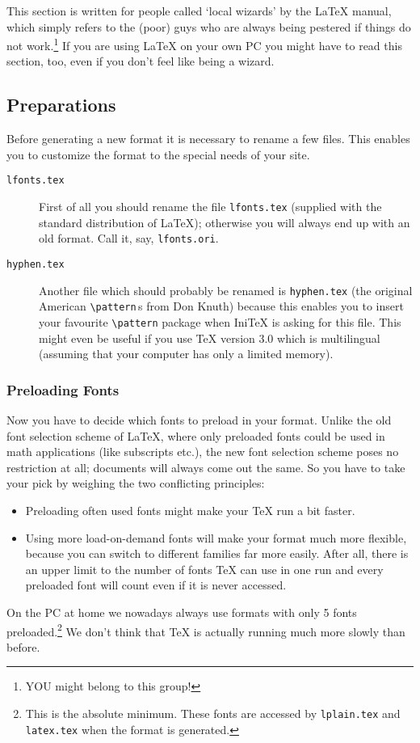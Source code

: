  This section is written for people called `local wizards' by the
 \LaTeX{} manual, which simply refers to the (poor) guys who
 are always being pestered
 if things do not work.\footnote{YOU might belong to this group!}
 If you are using \LaTeX{} on your own PC you might have to read this
 section, too, even if you don't feel like being a wizard.
 
 \subsection{Preparations}
 Before generating a new format it is necessary to rename a few files.
 This enables you to customize the format to the special needs of your
 site.
 
\begin{description}
  \item [\tt lfonts.tex]
    First of all you should rename the file {\tt lfonts.tex} (supplied
    with the standard distribution of \LaTeX{}); otherwise you
    will always end up with an old format.  Call it, say,
    {\tt lfonts.ori}.
  \item [\tt hyphen.tex]
    Another file which should probably be renamed is {\tt hyphen.tex}
    (the original American \verb+\pattern+$\,$s from Don Knuth) because
    this enables you to insert your favourite \verb+\pattern+ package
    when Ini\TeX{} is asking for this file. This might even be useful
    if you use \TeX{} version 3.0 which is multilingual (assuming that
    your computer has only a limited memory).
\end{description}
 
 
\subsubsection{Preloading Fonts}
 
 Now you have to decide which fonts to preload in your format.  Unlike
 the old font selection scheme of \LaTeX{}, where only preloaded fonts
 could be used in math applications (like subscripts etc.), the new
 font selection scheme poses no restriction at all; documents will
 always come out the same.
 So you have to take your pick by weighing
 the two conflicting principles:
\begin{itemize}
  \item
    Preloading often used fonts might make your \TeX{} run a bit faster.
  \item
    Using more load-on-demand fonts will make your format much more
    flexible, because you can switch to different families far more easily.
    After all, there is an upper limit to the number of fonts \TeX{}
    can use in one run and every preloaded font will count even if it
    is never accessed.
\end{itemize}
 On the PC at home we nowadays always use formats with only 5 fonts
 preloaded.\footnote{This is the absolute minimum. These fonts are
 accessed by {\tt lplain.tex} and {\tt latex.tex} when the format is
 generated.} We don't think that \TeX{} is actually running much
 more slowly than before.
 
